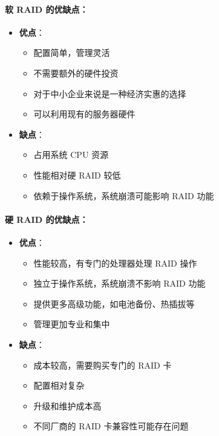 \documentclass[12pt,UTF8]{ctexbook}
\begin{document}
\paragraph{软 RAID 的优缺点：}
\begin{itemize}
    \item \textbf{优点}：
        \begin{itemize}
            \item 配置简单，管理灵活
            \item 不需要额外的硬件投资
            \item 对于中小企业来说是一种经济实惠的选择
            \item 可以利用现有的服务器硬件
        \end{itemize}
    \item \textbf{缺点}：
        \begin{itemize}
            \item 占用系统 CPU 资源
            \item 性能相对硬 RAID 较低
            \item 依赖于操作系统，系统崩溃可能影响 RAID 功能
        \end{itemize}
\end{itemize}

\paragraph{硬 RAID 的优缺点：}
\begin{itemize}
    \item \textbf{优点}：
        \begin{itemize}
            \item 性能较高，有专门的处理器处理 RAID 操作
            \item 独立于操作系统，系统崩溃不影响 RAID 功能
            \item 提供更多高级功能，如电池备份、热插拔等
            \item 管理更加专业和集中
        \end{itemize}
    \item \textbf{缺点}：
        \begin{itemize}
            \item 成本较高，需要购买专门的 RAID 卡
            \item 配置相对复杂
            \item 升级和维护成本高
            \item 不同厂商的 RAID 卡兼容性可能存在问题
        \end{itemize}
\end{itemize}
\end{document}
